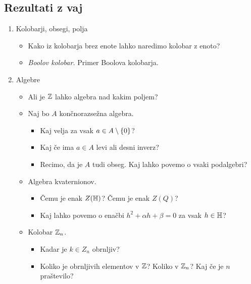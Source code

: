 \subsection*{Rezultati z vaj}
\begin{enumerate}
    \item Kolobarji, obsegi, polja
    \begin{itemize}
        \item Kako iz kolobarja brez enote lahko naredimo kolobar z enoto?
        \item \emph{Boolov kolobar.} Primer Boolova kolobarja.
    \end{itemize}

    \item Algebre
    \begin{itemize}
        \item Ali je $\mathbb{Z}$ lahko algebra nad kakim poljem?
        \item Naj bo $A$ končnorazsežna algebra.    
        \begin{itemize}
            \item Kaj velja za vsak $a \in A \setminus \left\{0\right\}$?
            \item Kaj če ima $a \in A$ levi ali desni inverz?
            \item Recimo, da je $A$ tudi obseg. Kaj lahko povemo o vsaki podalgebri?
        \end{itemize}
        \item Algebra kvaternionov.
        \begin{itemize}
            \item Čemu je enak $Z(\mathbb{H})$? Čemu je enak $Z(Q)$?
            \item Kaj lahko povemo o enačbi $h^2 + \alpha h + \beta = 0$ za vsak $h \in \mathbb{H}$?
        \end{itemize}

        \item Kolobar $\mathbb{Z}_n$.
        \begin{itemize}
            \item Kadar je $k \in Z_n$ obrnljiv?
            \item Koliko je obrnljivih elementov v $\mathbb{Z}$? Koliko v $\mathbb{Z}_n$? Kaj če je $n$ praštevilo?
        \end{itemize}
    \end{itemize}
\end{enumerate}